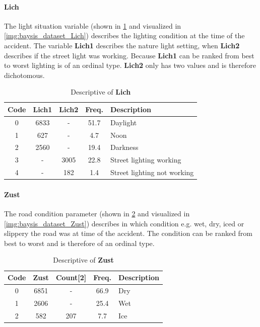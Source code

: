 \paragraph{Lich}
\label{baysis_dataset_Lich}
The light situation variable (shown in \cref{tbl:baysis_dataset_Lich} and visualized in \cref{img:baysis_dataset_Lich}) describes the lighting condition at the time of the accident. The variable \textbf{Lich1} describes the nature light setting, when \textbf{Lich2} describes if the street light was working. Because \textbf{Lich1} can be ranked from best to worst lighting is of an ordinal type. \textbf{Lich2} only has two values and is therefore dichotomous.
\begin{table}[ht]
	\centering
	\small
	\begin{tabular}{c|c|c|c|l}
		\toprule
		Code & \textbf{Lich1} & \textbf{Lich2} & Freq. & Description \\ 
		\midrule 
		0 & 6833 	& - 	& 51.7 & Daylight \\
		1 & 627 	& -		& 4.7  & Noon \\
		2 & 2560	& - 	& 19.4 & Darkness \\
		3 & - 		& 3005	& 22.8 & Street lighting working \\
		4 & - 		& 182	& 1.4  & Street lighting not working \\
		\bottomrule
	\end{tabular}
	\caption{Descriptive of \textbf{Lich}}
	\label{tbl:baysis_dataset_Lich}
	\vspace{-8mm}
\end{table} 
\paragraph{Zust}
\label{baysis_dataset_Zust}
The road condition parameter (shown in \cref{tbl:baysis_dataset_Zust} and visualized in \cref{img:baysis_dataset_Zust}) describes in which condition e.g. wet, dry, iced or slippery the road was at time of the accident. The condition can be ranked from best to worst and is therefore of an ordinal type.
\begin{table}[ht]
	\centering
	\small
	\begin{tabular}{c|c|c|c|l}
		\toprule
		Code & \textbf{Zust} & Count[2] & Freq. & Description \\ 
		\midrule 
		0 & 6851 	& -		& 66.9 & Dry \\ 
 		1 & 2606	& -		& 25.4 & Wet \\ 
 		2 & 582		& 207	& 7.7  & Ice \\
	\end{tabular}
	\caption{Descriptive of \textbf{Zust}}
	\label{tbl:baysis_dataset_Zust}
	\vspace{-8mm}
\end{table}
